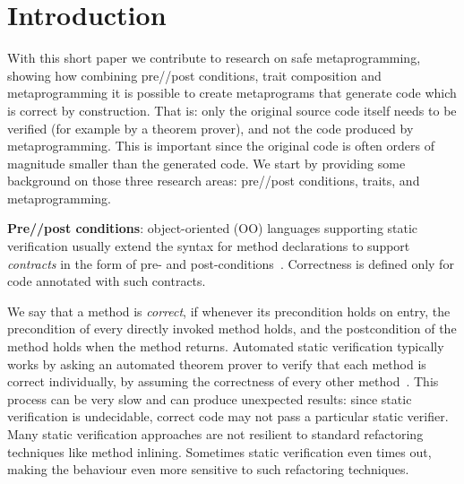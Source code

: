 \section{Introduction}
With this short paper we contribute
to research on safe metaprogramming, showing how combining 
pre//post conditions,
trait composition and metaprogramming
it is possible to create metaprograms that generate code which is correct by construction.
That is: only the original source code itself needs to be verified (for example by a theorem prover), and not the code produced by metaprogramming.
This is important since the original code is often orders of magnitude smaller than the generated code.
We start by providing some background on those three research areas: pre//post conditions, traits, and metaprogramming.

\textbf{Pre//post conditions}:
object-oriented (OO) languages supporting static verification usually extend the syntax for method declarations
to support \emph{contracts} in the form of pre- and post-conditions~\cite{Meyer:1988:OSC:534929}.
Correctness is defined only for code annotated with such contracts.

We say that a method is \emph{correct}, if whenever its precondition holds on entry, the precondition of every directly invoked method holds, and the postcondition of the method holds when the method returns. Automated static verification typically works by asking an automated theorem prover to verify that each method is correct individually, by assuming the correctness of every other method~\cite{barnett2004spec}. This process can be very slow and can produce unexpected results: since static verification is undecidable, correct code may not pass a particular static verifier.
Many static verification approaches are not resilient to
standard refactoring techniques like 
method inlining. Sometimes static verification even times out, making the behaviour even more sensitive to such refactoring techniques.



